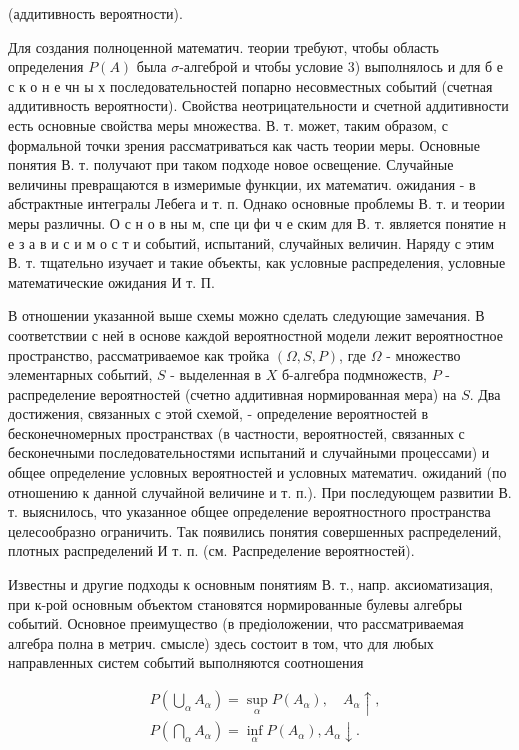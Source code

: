 \documentclass[10pt]{article}
\begin{document}
(аддитивность вероятности).



Для создания полноценной математич. теории требуют, чтобы область определения $P(A)$ была $\sigma$-алгеброй и чтобы условие 3) выполнялось и для б е с к о н е чн ы х последовательностей попарно несовместных событий (счетная аддитивность вероятности). Свойства неотрицательности и счетной аддитивности есть основные свойства меры множества. В. т. может, таким образом, с формальной точки зрения рассматриваться как часть теории меры. Основные понятия В. т. получают при таком подходе новое освещение. Случайные величины превращаются в измеримые функции, их математич. ожидания - в абстрактные интегралы Лебега и т. п. Однако основные проблемы В. т. и теории меры различны. О с н о в ны м, спе ци фи ч е ским для В. т. является понятие н е з а в и с и м о с т и событий, испытаний, случайных величин. Наряду с этим В. т. тщательно изучает и такие объекты, как условные распределения, условные математические ожидания И т. П.



В отношении указанной выше схемы можно сделать следующие замечания. В соответствии с ней в основе каждой вероятностной модели лежит вероятностное пространство, рассматриваемое как тройка $(\Omega, S, P)$, где $\Omega$ - множество элементарных событий, $S$ - выделенная в $X$ б-алгебра подмножеств, $P$ - распределение вероятностей (счетно аддитивная нормированная мера) на $S$. Два достижения, связанных с этой схемой, - определение вероятностей в бесконечномерных пространствах (в частности, вероятностей, связанных с бесконечными последовательностями испытаний и случайными процессами) и общее определение условных вероятностей и условных математич. ожиданий (по отношению к данной случайной величине и т. п.). При последующем развитии В. т. выяснилось, что указанное общее определение вероятностного пространства целесообразно ограничить. Так появились понятия совершенных распределений, плотных распределений И т. п. (см. Распределение вероятностей).



Известны и другие подходы к основным понятиям В. т., напр. аксиоматизация, при к-рой основным объектом становятся нормированные булевы алгебры событий. Основное преимущество (в предіоложении, что рассматриваемая алгебра полна в метрич. смысле) здесь состоит в том, что для любых направленных систем событий выполняются соотношения



\[

\begin{aligned}

& P\left(\bigcup_{\alpha} A_{\alpha}\right)=\sup _{\alpha} P\left(A_{\alpha}\right), \quad A_{\alpha} \uparrow, \\

& P\left(\bigcap_{\alpha} A_{\alpha}\right)=\inf _{\alpha} P\left(A_{\alpha}\right), A_{\alpha} \downarrow .

\end{aligned}

\]
\end{document}
